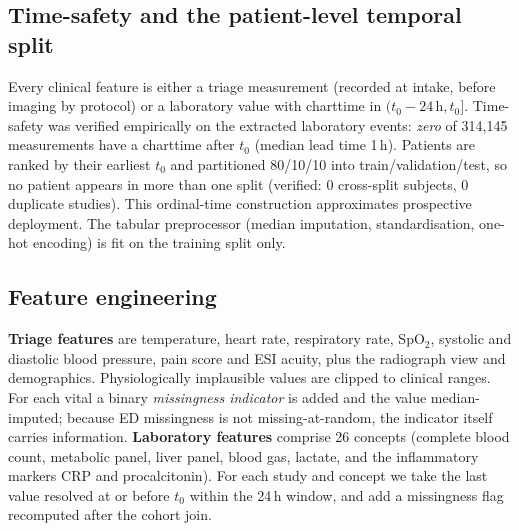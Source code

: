 \documentclass[twocolumn, final]{svjour3}
\begin{document}
\subsection{Time-safety and the patient-level temporal split}
\label{subsec:timesafety}
Every clinical feature is either a triage measurement (recorded at intake, before
imaging by protocol) or a laboratory value with charttime in
$(t_0{-}24\,\text{h}, t_0]$. Time-safety was verified empirically on the extracted
laboratory events: \emph{zero} of 314{,}145 measurements have a charttime after
$t_0$ (median lead time 1\,h). Patients are ranked by their earliest $t_0$ and
partitioned 80/10/10 into train/validation/test, so no patient appears in more than
one split (verified: 0 cross-split subjects, 0 duplicate studies). This ordinal-time
construction approximates prospective deployment. The tabular preprocessor (median
imputation, standardisation, one-hot encoding) is fit on the training split only.

\subsection{Feature engineering}
\label{subsec:features}
\textbf{Triage features} are temperature, heart rate, respiratory rate, SpO$_2$,
systolic and diastolic blood pressure, pain score and ESI acuity, plus the
radiograph view and demographics. Physiologically implausible values are clipped to
clinical ranges. For each vital a binary \emph{missingness indicator} is added and
the value median-imputed; because ED missingness is not missing-at-random, the
indicator itself carries information. \textbf{Laboratory features} comprise 26
concepts (complete blood count, metabolic panel, liver panel, blood gas, lactate, and
the inflammatory markers CRP and procalcitonin). For each study and concept we take
the last value resolved at or before $t_0$ within the 24\,h window, and add a
missingness flag recomputed after the cohort join.
\end{document}

